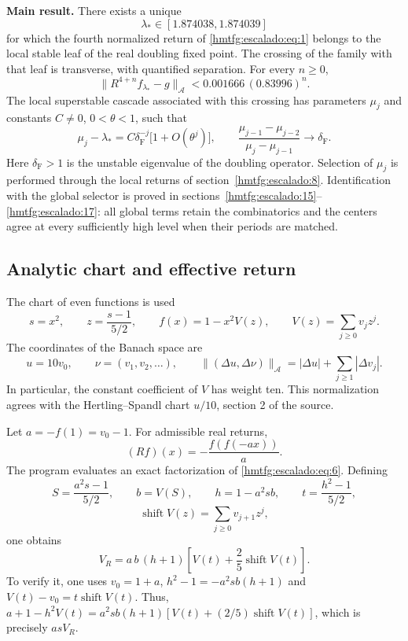 \textbf{Main result.} There exists a unique
\begin{equation}
\lambda_*\in[1.874038,1.874039]
\label{hmtfg:escalado:eq:2}
\end{equation}
for which the fourth normalized return of \eqref{hmtfg:escalado:eq:1} belongs to the local stable leaf of the real doubling fixed point. The crossing of the family with that leaf is transverse, with quantified separation. For every \(n\ge0\),
\begin{equation}
\boxed{\|R^{4+n}f_{\lambda_*}-g\|_{\mathcal A}
<0.001666\,(0.83996)^n.}
\label{hmtfg:escalado:eq:3}
\end{equation}
The local superstable cascade associated with this crossing has parameters \(\mu_j\) and constants \(C\ne0\), \(0<\theta<1\), such that
\begin{equation}
\mu_j-\lambda_*=C\delta_{\mathrm F}^{-j}\bigl[1+O(\theta^j)\bigr],
\qquad
\frac{\mu_{j-1}-\mu_{j-2}}{\mu_j-\mu_{j-1}}\longrightarrow\delta_{\mathrm F}.
\label{hmtfg:escalado:eq:4}
\end{equation}
Here \(\delta_{\mathrm F}>1\) is the unstable eigenvalue of the doubling operator. Selection of \(\mu_j\) is performed through the local returns of section~\ref{hmtfg:escalado:8}. Identification with the global selector is proved in sections~\ref{hmtfg:escalado:15}--\ref{hmtfg:escalado:17}: all global terms retain the combinatorics and the centers agree at every sufficiently high level when their periods are matched.


\subsection{Analytic chart and effective return}
\label{hmtfg:escalado:2}

The chart of even functions is used
\[
s=x^2,\qquad z=\frac{s-1}{5/2},\qquad
f(x)=1-x^2V(z),\qquad V(z)=\sum_{j\ge0}v_jz^j.
\]
The coordinates of the Banach space are
\begin{equation}
u=10v_0,\qquad \nu=(v_1,v_2,\ldots),\qquad
\|(\Delta u,\Delta\nu)\|_{\mathcal A}
=|\Delta u|+\sum_{j\ge1}|\Delta v_j|.
\label{hmtfg:escalado:eq:5}
\end{equation}
In particular, the constant coefficient of \(V\) has weight ten. This normalization agrees with the Hertling–Spandl chart \(u/10\), section 2 of the source.

Let \(a=-f(1)=v_0-1\). For admissible real returns,
\begin{equation}
(Rf)(x)=-\frac{f(f(-ax))}{a}.
\label{hmtfg:escalado:eq:6}
\end{equation}
The program evaluates an exact factorization of \eqref{hmtfg:escalado:eq:6}. Defining
\[
S=\frac{a^2s-1}{5/2},\qquad b=V(S),\qquad
h=1-a^2sb,\qquad t=\frac{h^2-1}{5/2},
\]
\[
\operatorname{shift}V(z)=\sum_{j\ge0}v_{j+1}z^j,
\]
one obtains
\begin{equation}
\boxed{V_R=a\,b\,(h+1)\left[V(t)+\frac25\operatorname{shift}V(t)\right].}
\label{hmtfg:escalado:eq:7}
\end{equation}
To verify it, one uses \(v_0=1+a\),
\(h^2-1=-a^2sb(h+1)\) and
\(V(t)-v_0=t\operatorname{shift}V(t)\). Thus,
\(a+1-h^2V(t)=a^2sb(h+1)[V(t)+(2/5)\operatorname{shift}V(t)]\),
which is precisely \(asV_R\).

